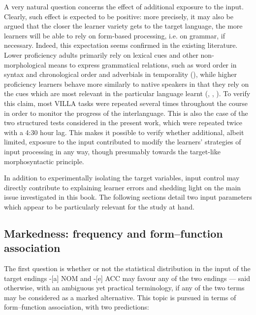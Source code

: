 A very natural question concerns the effect of additional exposure to the input. Clearly, such effect is expected to be positive: more precisely, it may also be argued that the closer the learner variety gets to the target language, the more learners will be able to rely on form-based processing, i.e. on grammar, if necessary. Indeed, this expectation seems confirmed in the existing literature. Lower proficiency adults primarily rely on lexical cues and other non-morphological means to express grammatical relations, such as word order in syntax and chronological order and adverbials in temporality (\citealt{Bardovi-Harlig2000, Lee2002, Leeser2004, EllisSagarra2010a}), while higher proficiency learners behave more similarly to native speakers in that they rely on the cues which are most relevant in the particular language learnt (\citealt{Bardovi-Harlig1992b}, \citeyear{Bardovi-Harlig2000}, \citealt{Giacalone-Ramat1992,  SkibaDittmar1992, DietrichEtAl1995, Starren2001, ParodiEtAl2006, BordagPechmann2007}). To verify this claim, most VILLA tasks were repeated several times throughout the course in order to monitor the progress of the interlanguage. This is also the case of the two structured tests considered in the present work, which were repeated twice with a 4:30 hour lag. This makes it possible to verify whether additional, albeit limited, exposure to the input contributed to modify the learners’ strategies of input processing in any way, though presumably towards the target-like morphosyntactic principle.

In addition to experimentally isolating the target variables, input control may directly contribute to explaining learner errors and shedding light on the main issue investigated in this book. The following sections detail two input parameters which appear to be particularly relevant for the study at hand. 

\subsection{Markedness: frequency and form–function association}\label{sec:01:4.1}

The first question is whether or not the statistical distribution in the input of the target endings -[a] NOM and -[e] ACC may favour any of the two endings — said otherwise, with an ambiguous \citep{Haspelmath2006} yet practical terminology, if any of the two terms may be considered as a marked alternative. This topic is pursued in terms of form–function association, with two predictions: 

